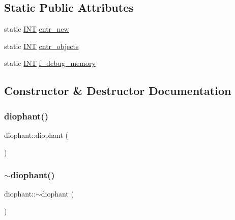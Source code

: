 \subsection*{Static Public Attributes}
\begin{DoxyCompactItemize}
\item 
static \mbox{\hyperlink{galois_8h_a09fddde158a3a20bd2dcadb609de11dc}{I\+NT}} \mbox{\hyperlink{classdiophant_a71a660775fa8c5ad38106ad1539d90e3}{cntr\+\_\+new}}
\item 
static \mbox{\hyperlink{galois_8h_a09fddde158a3a20bd2dcadb609de11dc}{I\+NT}} \mbox{\hyperlink{classdiophant_a67a20184f86d804fc02e5fbc9508ee14}{cntr\+\_\+objects}}
\item 
static \mbox{\hyperlink{galois_8h_a09fddde158a3a20bd2dcadb609de11dc}{I\+NT}} \mbox{\hyperlink{classdiophant_a9f4d3ef4f5d255ced17f1069d0e2ab46}{f\+\_\+debug\+\_\+memory}}
\end{DoxyCompactItemize}


\subsection{Constructor \& Destructor Documentation}
\mbox{\label{classdiophant_ae898c535557b30104376ebfb186b8c31}} 
\subsubsection{\texorpdfstring{diophant()}{diophant()}}
{\footnotesize\ttfamily diophant\+::diophant (\begin{DoxyParamCaption}{ }\end{DoxyParamCaption})}

\mbox{\label{classdiophant_a2ab3304795de1097fe60e6e8b2145466}} 
\subsubsection{\texorpdfstring{$\sim$diophant()}{~diophant()}}
{\footnotesize\ttfamily diophant\+::$\sim$diophant (\begin{DoxyParamCaption}{ }\end{DoxyParamCaption})}



